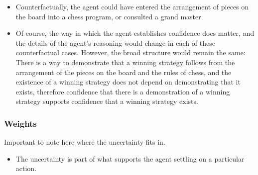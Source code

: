 \documentclass[10pt]{article}
\begin{document}
\begin{itemize}
\begin{itemize}
\begin{itemize}
  \item Counterfactually, the agent could have entered the arrangement of pieces on the board into a chess program, or consulted a grand master.
  \item Of course, the way in which the agent establishes confidence does matter, and the details of the agent's reasoning would change in each of these counterfactual cases.
    However, the broad structure would remain the same: There is a way to demonstrate that a winning strategy follows from the arrangement of the pieces on the board and the rules of chess, and the existence of a winning strategy does not depend on demonstrating that it exists, therefore confidence that there is a demonstration of a winning strategy supports confidence that a winning strategy exists.
    \end{itemize}
  \end{itemize}
\end{itemize}


\subsubsection{Weights}
\label{sec:weights}

\begin{note}
  Important to note here where the uncertainty fits in.
  \begin{itemize}
  \item The uncertainty is part of what supports the agent settling on a particular action.
  \end{itemize}
\end{note}
\end{document}
